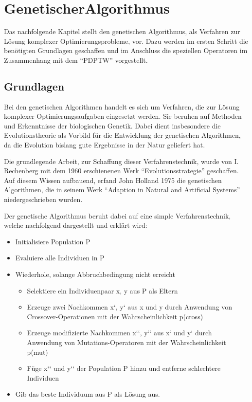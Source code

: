 \section{GenetischerAlgorithmus}
\label{sec:GenetischerAlgorithmus}
Das nachfolgende Kapitel stellt den genetischen Algorithmus, als Verfahren zur Lösung komplexer Optimierungsprobleme, vor. Dazu werden im ersten Schritt die benötigten Grundlagen geschaffen und im Anschluss die speziellen Operatoren im Zusammenhang mit dem "`PDPTW"' vorgestellt. 

\subsection{Grundlagen}
Bei den genetischen Algorithmen handelt es sich um Verfahren, die zur Lösung komplexer Optimierungsaufgaben eingesetzt werden. Sie beruhen auf Methoden und Erkenntnisse der biologischen Genetik. Dabei dient insbesondere die Evolutionstheorie als Vorbild für die Entwicklung der genetischen Algorithmen, da die Evolution bislang gute Ergebnisse in der Natur geliefert hat. \cite{jih2004family} \cite{bortfeldtplanen}

Die grundlegende Arbeit, zur Schaffung dieser Verfahrenstechnik, wurde von I. Rechenberg mit dem 1960 erschienenen Werk "`Evolutionsstrategie"' geschaffen. Auf diesem Wissen aufbauend, erfand John Holland 1975 die genetischen Algorithmen, die in seinem Werk "`Adaption in Natural and Artificial Systems"' niedergeschrieben wurden.

Der genetische Algorithmus beruht dabei auf eine simple Verfahrenstechnik, welche nachfolgend dargestellt und erklärt wird:
\begin{itemize}
 \item Initialisiere Population P
 \item Evaluiere alle Individuen in P
 \item Wiederhole, solange Abbruchbedingung nicht erreicht
 \begin{itemize}
  \item Selektiere ein Individuenpaar x, y aus P als Eltern
  \item Erzeuge zwei Nachkommen x‘, y‘ aus x und y durch Anwendung von Crossover-Operationen mit der Wahrscheinlichkeit p(cross)
  \item Erzeuge modifizierte Nachkommen x‘‘, y‘‘ aus x‘ und y‘ durch Anwendung von Mu\-ta\-tions-Operatoren mit der Wahrscheinlichkeit p(mut)
  \item Füge x‘‘ und y‘‘ der Population P hinzu und entferne schlechtere Individuen
 \end{itemize}
 \item Gib das beste Individuum aus P als Lösung aus.
\end{itemize}

